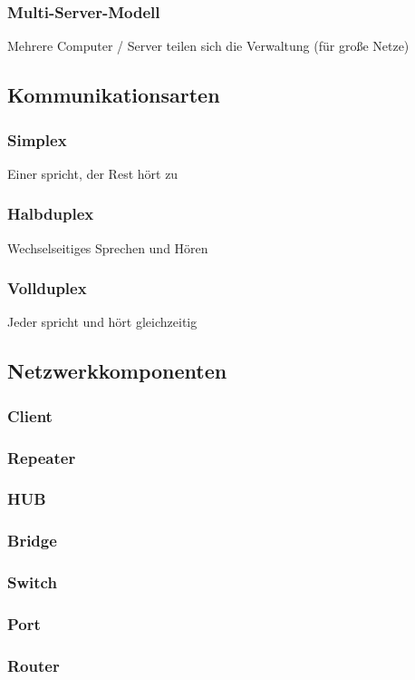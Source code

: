 \documentclass[12pt,a4paper]{article}
\begin{document}
\subsubsection{Multi-Server-Modell}
Mehrere Computer / Server teilen sich die Verwaltung (für große Netze)
\subsection{Kommunikationsarten}
\subsubsection{Simplex}
Einer spricht, der Rest hört zu
\subsubsection{Halbduplex}
Wechselseitiges Sprechen und Hören
\subsubsection{Vollduplex}
Jeder spricht und hört gleichzeitig
\subsection{Netzwerkkomponenten}
\subsubsection{Client}
\subsubsection{Repeater}
\subsubsection{HUB}
\subsubsection{Bridge}
\subsubsection{Switch}
\subsubsection{Port}
\subsubsection{Router}
\end{document}
